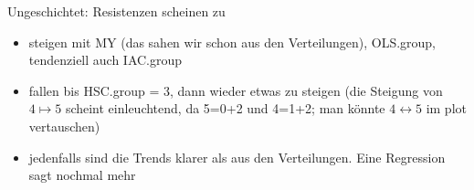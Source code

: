 \documentclass[
]{article}
\providecommand{\tightlist}{%
  \setlength{\itemsep}{0pt}\setlength{\parskip}{0pt}}
\begin{document}
Ungeschichtet: Resistenzen scheinen zu

\begin{itemize}
\tightlist
\item
  steigen mit MY (das sahen wir schon aus den Verteilungen), OLS.group,
  tendenziell auch IAC.group
\item
  fallen bis HSC.group = 3, dann wieder etwas zu steigen (die Steigung
  von \(4\mapsto5\) scheint einleuchtend, da 5=0+2 und 4=1+2; man könnte
  \(4\leftrightarrow 5\) im plot vertauschen)
\item
  jedenfalls sind die Trends klarer als aus den Verteilungen. Eine
  Regression sagt nochmal mehr
\end{itemize}
\end{document}
